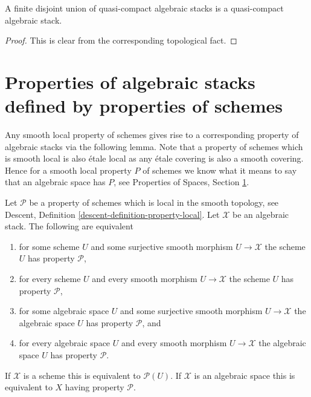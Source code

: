 \begin{lemma}
\label{lemma-finite-disjoint-quasi-compact}
A finite disjoint union of quasi-compact algebraic stacks is
a quasi-compact algebraic stack.
\end{lemma}

\begin{proof}
This is clear from the corresponding topological fact.
\end{proof}


\section{Properties of algebraic stacks defined by properties of schemes}
\label{section-types-properties}

\noindent
Any smooth local property of schemes gives rise to a corresponding
property of algebraic stacks via the following lemma. Note that a
property of schemes which is smooth local is also \'etale local
as any \'etale covering is also a smooth covering. Hence for a smooth
local property $P$ of schemes we know what it means to say that
an algebraic space has $P$, see
Properties of Spaces, Section \ref{section-types-properties}.

\begin{lemma}
\label{lemma-type-property}
Let $\mathcal{P}$ be a property of schemes which is local in the smooth
topology, see
Descent, Definition \ref{descent-definition-property-local}.
Let $\mathcal{X}$ be an algebraic stack. The following are equivalent
\begin{enumerate}
\item for some scheme $U$ and some surjective smooth morphism
$U \to \mathcal{X}$ the scheme $U$ has property $\mathcal{P}$,
\item for every scheme $U$ and every smooth morphism $U \to \mathcal{X}$
the scheme $U$ has property $\mathcal{P}$,
\item for some algebraic space $U$ and some surjective smooth morphism
$U \to \mathcal{X}$ the algebraic space $U$ has property $\mathcal{P}$, and
\item for every algebraic space $U$ and every smooth morphism
$U \to \mathcal{X}$ the algebraic space $U$ has property $\mathcal{P}$.
\end{enumerate}
If $\mathcal{X}$ is a scheme this is equivalent to $\mathcal{P}(U)$.
If $\mathcal{X}$ is an algebraic space this is equivalent to
$X$ having property $\mathcal{P}$.
\end{lemma}

